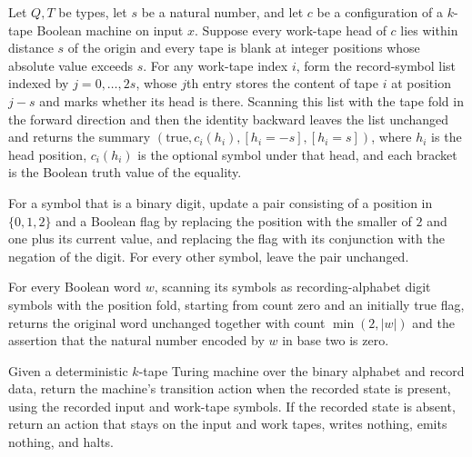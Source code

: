 \begin{theorem}
\label{Turing.recordStep_tape_fold}
\leanok
{}
Let $Q,T$ be types, let $s$ be a natural number, and let $c$ be a configuration of a
$k$-tape Boolean machine on input $x$. Suppose every work-tape head of $c$ lies within
distance $s$ of the origin and every tape is blank at integer positions whose absolute
value exceeds $s$. For any work-tape index $i$, form the record-symbol list indexed by
$j=0,\ldots,2s$, whose $j$th entry stores the content of tape $i$ at position $j-s$ and
marks whether its head is there. Scanning this list with the tape fold in the forward
direction and then the identity backward leaves the list unchanged and returns the
summary $(\mathrm{true},c_i(h_i),[h_i=-s],[h_i=s])$, where $h_i$ is the head position,
$c_i(h_i)$ is the optional symbol under that head, and each bracket is the Boolean truth
value of the equality.
\end{theorem}

\begin{definition}
\label{Turing.recordStepPosFold}
\leanok
{}
For a symbol that is a binary digit, update a pair consisting of a position in
$\{0,1,2\}$ and a Boolean flag by replacing the position with the smaller of $2$ and one
plus its current value, and replacing the flag with its conjunction with the negation of
the digit. For every other symbol, leave the pair unchanged.
\end{definition}

\begin{theorem}
\label{Turing.recordStep_position_fold}
\leanok
{}
For every Boolean word $w$, scanning its symbols as recording-alphabet digit symbols
with the position fold, starting from count zero and an initially true flag, returns the
original word unchanged together with count $\min(2,|w|)$ and the assertion that the
natural number encoded by $w$ in base two is zero.
\end{theorem}

\begin{definition}
\label{Turing.recordStepAction}
\leanok
{}
Given a deterministic $k$-tape Turing machine over the binary alphabet and record data,
return the machine's transition action when the recorded state is present, using the
recorded input and work-tape symbols. If the recorded state is absent, return an action
that stays on the input and work tapes, writes nothing, emits nothing, and halts.
\end{definition}

